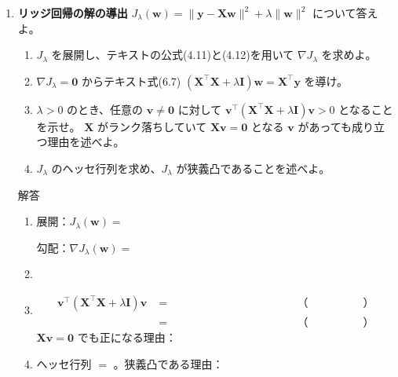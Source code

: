 \documentclass[a4paper,dvipdfmx]{jsarticle}
\newcommand{\提出期限}{2026年11月2日（月）}
\newcommand{\学籍番号}{0000000}
\newcommand{\氏名}{氏名を書く}
\newcommand{\提出日}{2026年11月2日}
\newenvironment{answer}{\begin{itembox}[l]{解答}}{\end{itembox}}
\begin{document}
\begin{enumerate}


  \item \textbf{リッジ回帰の解の導出}\quad
    $J_\lambda(\bm{w}) = \|\bm{y} - \bm{X}\bm{w}\|^2 + \lambda\|\bm{w}\|^2$ について答えよ。
    \begin{enumerate}
      \item $J_\lambda$ を展開し、テキストの公式(4.11)と(4.12)を用いて $\nabla J_\lambda$ を求めよ。
      \item $\nabla J_\lambda = \bm{0}$ からテキスト式(6.7) $(\bm{X}^\top\bm{X} + \lambda\bm{I})\bm{w} = \bm{X}^\top\bm{y}$ を導け。
      \item $\lambda > 0$ のとき、任意の $\bm{v} \neq \bm{0}$ に対して $\bm{v}^\top(\bm{X}^\top\bm{X} + \lambda\bm{I})\bm{v} > 0$ となることを示せ。
        $\bm{X}$ がランク落ちしていて $\bm{X}\bm{v} = \bm{0}$ となる $\bm{v}$ があっても成り立つ理由を述べよ。
      \item $J_\lambda$ のヘッセ行列を求め、$J_\lambda$ が狭義凸であることを述べよ。
    \end{enumerate}
    \begin{answer}
      \begin{enumerate}
        \item 展開：$J_\lambda(\bm{w}) = $ \phantom{XXXXXXXXXXXXXXXXXXXXXXXX}
          \vspace{4mm}

          勾配：$\nabla J_\lambda(\bm{w}) = $ \phantom{XXXXXXXXXXXXXXXXXX}
          \vspace{4mm}
        \item
          \vspace{10mm}
        \item
          \begin{align*}
            \bm{v}^\top(\bm{X}^\top\bm{X} + \lambda\bm{I})\bm{v}
              &= \phantom{XXXXXXXXXXXX} && \text{（　　　　　）} \\
              &= \phantom{XXXXXXXXXXXX} && \text{（　　　　　）}
          \end{align*}
          $\bm{X}\bm{v} = \bm{0}$ でも正になる理由：
          \vspace{10mm}
        \item ヘッセ行列 $= $ \phantom{XXXXXXXXXX}。狭義凸である理由：
          \vspace{10mm}
      \end{enumerate}
    \end{answer}


\end{enumerate}
\end{document}
